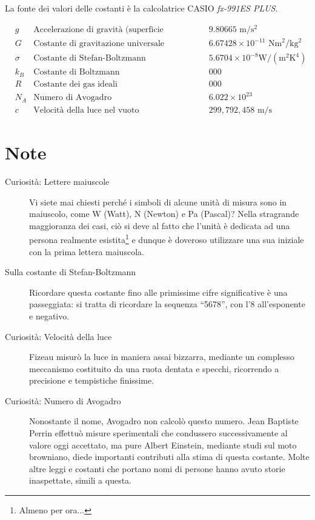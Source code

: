 
\vspace*{0.5cm}
La fonte dei valori delle costanti è la calcolatrice CASIO
\textit{fx-991ES PLUS}.

\begin{align*}
    &g      & \text{Accelerazione di gravità (superficie terrestre)} && 9.80665 \text{ m}/\text{s}^2\\
    &G      & \text{Costante di gravitazione universale}             && 6.67428 \times 10^{-11} \text{ Nm}^2/\text{kg}^2\\
    &\sigma & \text{Costante di Stefan-Boltzmann}                    && 5.6704 \times 10^{-8} \text{W}/(\text{m}^2\text{K}^4)\\
    &k_B    & \text{Costante di Boltzmann}                           && 000\\
    &R      & \text{Costante dei gas ideali}                         && 000\\
    &N_A    & \text{Numero di Avogadro}                              && 6.022 \times 10^{23}\\
    &c      & \text{Velocità della luce nel vuoto}                   && 299,792,458 \text{ m}/\text{s}
\end{align*}

\section*{Note}
\begin{description}
    \item[Curiosità: Lettere maiuscole] Vi siete mai chiesti perché
    i simboli di alcune unità di misura sono in maiuscolo, come
    W (Watt), N (Newton) e Pa (Pascal)? Nella
    stragrande maggioranza dei casi, ciò si deve al fatto che l'unità
    è dedicata ad una persona realmente esistita\footnote{Almeno per
    ora...} e dunque è doveroso utilizzare una sua iniziale con la
    prima lettera maiuscola.

    \item[Sulla costante di Stefan-Boltzmann] Ricordare questa costante
    fino alle primissime cifre significative è una passeggiata: si
    tratta di ricordare la sequenza ``5678'', con l'8 all'esponente
    e negativo.

    \item[Curiosità: Velocità della luce] Fizeau misurò la luce in
    maniera assai bizzarra, mediante un complesso meccanismo costituito
    da una ruota dentata e specchi, ricorrendo a precisione
    e tempistiche finissime.

    \item[Curiosità: Numero di Avogadro] Nonostante il nome, Avogadro
    non calcolò questo numero. Jean Baptiste Perrin effettuò misure
    sperimentali che condussero successivamente al valore oggi accettato,
    ma pure Albert Einstein, mediante studi sul moto browniano, diede
    importanti contributi alla stima di questa costante. Molte altre
    leggi e costanti che portano nomi di persone hanno avuto storie
    inaspettate, simili a questa.
\end{description}